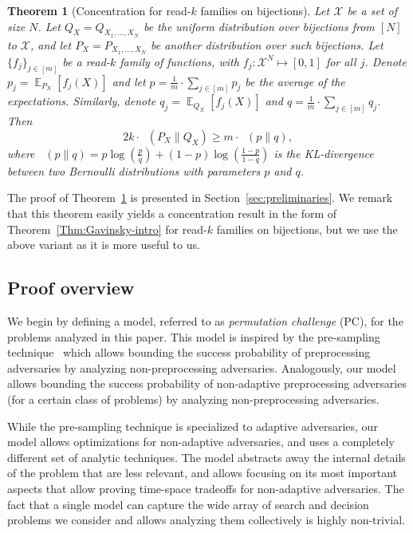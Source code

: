 \documentclass[11pt]{article}
\newtheorem{theorem}{Theorem}[section]
\DeclareMathOperator*{\E}{\mathbb{E}}
\DeclareMathOperator{\KL}{D_{\text{KL}}}
\begin{document}
\begin{theorem}[Concentration for read-$k$ families on bijections] 
\label{thm:Gavinsky-perm}
Let $\mathcal{X}$ be a set of size $N$. Let $Q_X = Q_{X_1,\ldots,X_N}$ be the uniform distribution over bijections from $[N]$ to $\mathcal{X}$,
and let $P_X = P_{X_1,\ldots,X_N}$ be another distribution over such bijections. 
Let $\{ f_j \}_{j \in [m]}$ be a read-$k$ family of functions, with $f_j:\mathcal{X}^N \mapsto [0,1]$ for all $j$. Denote $p_j = \E_{P_X}[f_j(X)]$ and let $p = \frac{1}{m} \cdot \sum_{j \in [m]} p_j$ be the average of the expectations. Similarly, denote $q_j = \E_{Q_X}[f_j(X)]$ and $q = \frac{1}{m} \cdot \sum_{j \in [m]} q_j$.
Then
$$2k \cdot  \KL( P_X \| Q_X ) \geq m \cdot \KL( p \| q ),$$
where $\KL( p \| q ) = p \log(\frac{p}{q}) + (1-p)\log(\frac{1-p}{1-q})$ is the KL-divergence between two Bernoulli distributions with parameters $p$ and $q$.
\end{theorem}
The proof of Theorem~\ref{thm:Gavinsky-perm} is presented in Section~\ref{sec:preliminaries}.
We remark that this theorem easily yields a
concentration result in the form of Theorem~\ref{Thm:Gavinsky-intro} for read-$k$ families on bijections, but we use the above variant as it is more useful to us. 


\subsection{Proof overview}\label{sec:proof-overview}
We begin by defining a model, referred to as \emph{permutation challenge} (PC), for the problems analyzed in this paper.
This model is inspired by 
the pre-sampling technique~\cite{BartusekMZ19,CorettiDG18,CorettiDGS18,DodisGK17,Unruh07} which allows bounding the success probability of preprocessing adversaries by analyzing non-preprocessing adversaries. 
Analogously, our model allows bounding the success probability of non-adaptive preprocessing adversaries (for a certain class of problems) by analyzing non-preprocessing adversaries.

While the pre-sampling technique is specialized to adaptive adversaries,
our model allows optimizations for non-adaptive adversaries, and uses a completely different set of analytic techniques. The model abstracts away the internal details of the problem that are less relevant, and allows focusing on its most important aspects that allow proving time-space tradeoffs for non-adaptive adversaries. 
The fact that a single model can capture  the wide array of search and decision problems we consider and allows analyzing them collectively is highly non-trivial. 
\end{document}

